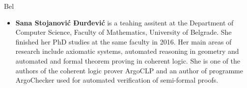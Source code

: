 \begin{sitedescription}{Bel}
\begin{itemize}
  \item{\bf Sana Stojanović Đurđević} is a teahing assitent at the
    Department of Computer Science, Faculty of Mathematics, University
    of Belgrade. She finished her PhD studies at the same faculty in
    2016.  Her main areas of research include axiomatic systems,
    automated reasoning in geometry and automated and formal theorem
    proving in coherent logic. She is one of the authors of the
    coherent logic prover ArgoCLP and an author of programme ArgoChecker
    used for automated verification of semi-formal proofs.

  \end{itemize}
    
  
  
\end{sitedescription}

